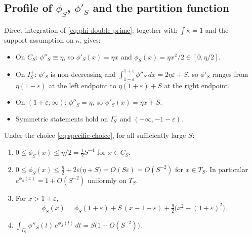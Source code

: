 \subsection*{Profile of $\phi_S$, $\phi'_S$ and the partition function}

Direct integration of \eqref{eq:phi-double-prime}, together with
$\int\kappa=1$ and the support assumption on $\kappa$, gives:
\begin{itemize}
\item On $C_S$: $\phi''_S\equiv\eta$, so $\phi'_S(x)=\eta x$ and
  $\phi_S(x)=\eta x^2/2\in[0,\eta/2]$.
\item On $I_S^+$: $\phi'_S$ is non-decreasing and
  $\int_{1-\varepsilon}^{1+\varepsilon}\phi''_S\,dx=2\eta\varepsilon+S$, so
  $\phi'_S$ ranges from $\eta(1-\varepsilon)$ at the left endpoint to
  $\eta(1+\varepsilon)+S$ at the right endpoint.
\item On $(1+\varepsilon,\infty)$: $\phi''_S=\eta$, so
  $\phi'_S(x)=\eta x+S$.
\item Symmetric statements hold on $I_S^-$ and $(-\infty,-1-\varepsilon)$.
\end{itemize}

\begin{lemma}\label{lem:phi-bounds}
Under the choice \eqref{eq:specific-choice}, for all sufficiently large $S$:
\begin{enumerate}
\item[(a)] $0\le\phi_S(x)\le\eta/2=\tfrac{1}{2}S^{-4}$ for $x\in C_S$.
\item[(b)] $0\le\phi_S(x)\le \tfrac{\eta}{2}+2\varepsilon\bigl(\eta+S\bigr)
  =O(S\varepsilon)=O(S^{-2})$ for $x\in T_S$. In particular
  $e^{\phi_S(x)}=1+O(S^{-2})$ uniformly on $T_S$.
\item[(c)] For $x>1+\varepsilon$,
  \[
    \phi_S(x)
    =\phi_S(1+\varepsilon)
     +S\,(x-1-\varepsilon)
     +\tfrac{\eta}{2}\bigl(x^2-(1+\varepsilon)^2\bigr).
  \]
\item[(d)] $\displaystyle\int_{I_S^+}\phi''_S(t)\,e^{\phi_S(t)}\,dt
  =S\bigl(1+O(S^{-2})\bigr)$.
\end{enumerate}
\end{lemma}

